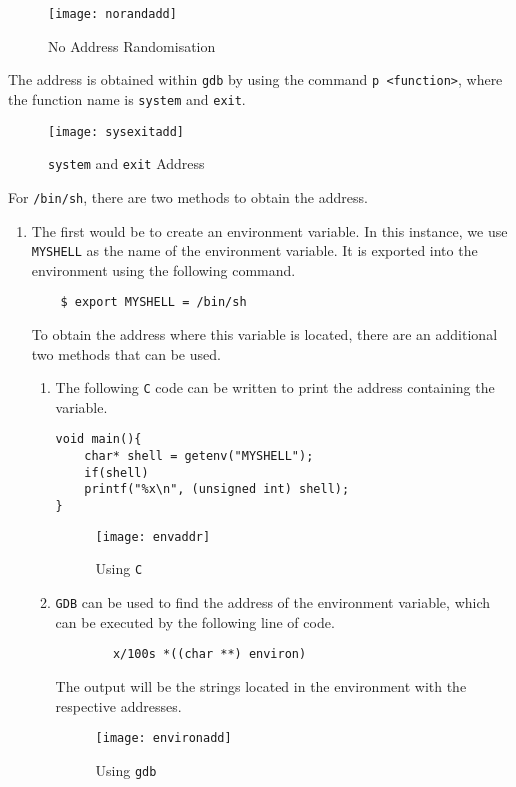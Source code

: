 \documentclass[a4paper,12pt]{article}
\begin{document}
\begin{figure}[H]
	\centering
	\texttt{[image: norandadd]}
	\caption{No Address Randomisation}
	\label{fig:norandadd}
\end{figure}
\noindent The address is obtained within \texttt{gdb} by using the command \texttt{p <function>}, where the function name is \texttt{system} and \texttt{exit}.
\begin{figure}[H]
	\centering
	\texttt{[image: sysexitadd]}
	\caption{\texttt{system} and \texttt{exit} Address}
	\label{fig:sysexitadd}
\end{figure}
For \texttt{/bin/sh}, there are two methods to obtain the address.
\begin{enumerate}
	\item The first would be to create an environment variable. In this instance, we use \texttt{MYSHELL} as the name of the environment variable. It is exported into the environment using the following command.
	\begin{verbatim}
	$ export MYSHELL = /bin/sh
	\end{verbatim}
	To obtain the address where this variable is located, there are an additional two methods that can be used.
	\begin{enumerate}
		\item The following \texttt{C} code can be written to print the address containing the variable.
		\begin{verbatim}
void main(){
    char* shell = getenv("MYSHELL");
    if(shell)
    printf("%x\n", (unsigned int) shell);
}
		\end{verbatim}
		
		\begin{figure}[H]
			\centering
			\texttt{[image: envaddr]}
			\caption{Using \texttt{C}}
			\label{fig:envaddr}
		\end{figure}
		\item \texttt{GDB} can be used to find the address of the environment variable, which can be executed by the following line of code.
		\begin{verbatim}
		x/100s *((char **) environ)
		\end{verbatim}
		The output will be the strings located in the environment with the respective addresses.
		\begin{figure}[H]
			\centering
			\texttt{[image: environadd]}
			\caption{Using \texttt{gdb}}
			\label{fig:environadd}
		\end{figure}
		

\end{enumerate}
\end{enumerate}
\end{document}
